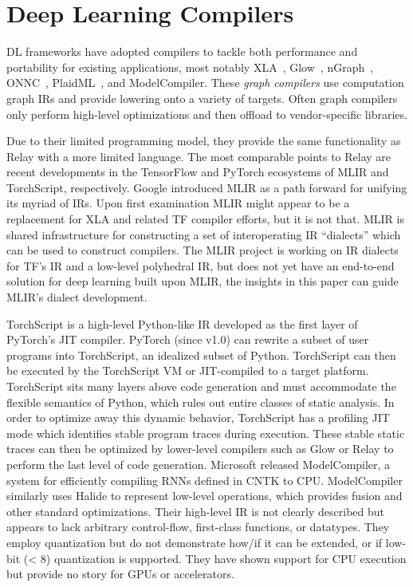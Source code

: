 \section{Deep Learning Compilers}

DL frameworks have adopted compilers
    to tackle both performance and portability
    for existing applications, most notably
    XLA~\citep{xla}, Glow~\citep{glow}, nGraph~\citep{ngraph}, ONNC~\citep{onnc},
    PlaidML~\citep{plaidml}, and ModelCompiler.
These \textit{graph compilers} use computation graph IRs and provide
    lowering onto a variety of targets.
Often graph compilers only perform high-level optimizations
    and then offload to vendor-specific libraries.

Due to their limited programming model, they
    provide the same functionality as Relay with
    a more limited language.
The most comparable points to Relay are recent
    developments in the TensorFlow and PyTorch
    ecosystems of MLIR and TorchScript, respectively.
Google introduced MLIR as a path forward for
    unifying its myriad of IRs.
Upon first examination MLIR might appear to be
    a replacement for XLA and related TF compiler
    efforts, but it is not that.
MLIR is shared infrastructure for constructing
    a set of interoperating IR ``dialects'' which
    can be used to construct compilers.
The MLIR project is working on IR dialects
    for TF's IR and a low-level polyhedral IR,
    but does not yet have an end-to-end solution for
    deep learning built upon MLIR, the insights in
    this paper can guide MLIR's dialect development.

TorchScript is a high-level Python-like IR developed as the first
    layer of PyTorch's JIT compiler.
PyTorch (since v1.0) can rewrite a subset of user programs into
    TorchScript, an idealized subset of Python.
TorchScript can then be executed by the TorchScript VM or JIT-compiled to a target platform.
TorchScript sits many layers above code generation and must accommodate
    the flexible semantics of Python, which rules out entire classes of static analysis.
In order to optimize away this dynamic behavior, TorchScript has
    a profiling JIT mode which identifies stable program traces
    during execution.
These stable static traces can then be optimized by lower-level
    compilers such as Glow or Relay to perform the last level of code generation.
Microsoft released ModelCompiler, a system for efficiently compiling RNNs defined
    in CNTK to CPU.
ModelCompiler similarly uses Halide to represent low-level operations,
    which provides fusion and other standard optimizations.
Their high-level IR is not clearly described but appears to lack arbitrary
    control-flow, first-class functions, or datatypes.
They employ quantization but do not demonstrate how/if it can be extended,
    or if low-bit (< 8) quantization is supported.
They have shown support for CPU execution but provide no
    story for GPUs or accelerators.

